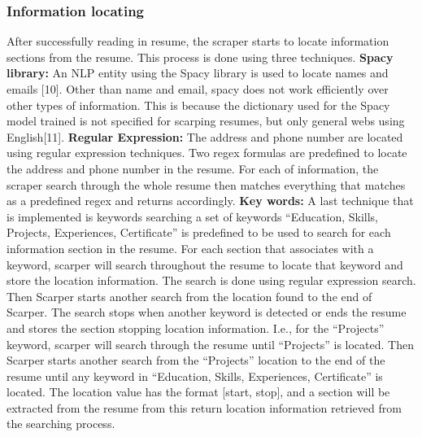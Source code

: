 \documentclass{article}
\begin{document}
\subsubsection{Information locating }
After successfully reading in resume, the scraper starts to locate information sections from the resume. This process is done using three techniques. 
\subsubsubsection \textbf{{Spacy library: }}
 An NLP entity using the Spacy library is used to locate names and emails [10]. Other than name and email, spacy does not work efficiently over other types of information. This is because the dictionary used for the Spacy model trained is not specified for scarping resumes, but only general webs using English[11]. 
 \subsubsubsection \textbf{{Regular Expression:}}
 The address and phone number are located using regular expression techniques. Two regex formulas are predefined to locate the address and phone number in the resume. For each of information, the scraper search through the whole resume then matches everything that matches as a predefined regex and returns accordingly.
\subsubsubsection \textbf{{Key words:}}
A last technique that is implemented is keywords searching a set of keywords “Education, Skills, Projects, Experiences, Certificate” is predefined to be used to search for each information section in the resume. For each section that associates with a keyword, scarper will search throughout the resume to locate that keyword and store the location information. The search is done using regular expression search. Then Scarper starts another search from the location found to the end of Scarper. The search stops when another keyword is detected or ends the resume and stores the section stopping location information. I.e., for the “Projects” keyword, scarper will search through the resume until “Projects” is located. Then Scarper starts another search from the “Projects” location to the end of the resume until any keyword in “Education, Skills, Experiences, Certificate” is located. The location value has the format [start, stop], and a section will be extracted from the resume from this return location information retrieved from the searching process.
\end{document}

